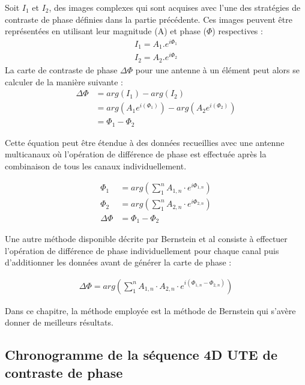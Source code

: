 Soit $I_1$ et $I_2$, des images complexes qui sont acquises avec l'une des stratégies de contraste de phase définies dans la partie précédente. Ces images peuvent être représentées en utilisant leur magnitude (A) et phase ($\Phi$) respectives :
\begin{equation}
\begin{split}
I_1= A_1 . e^{i \Phi_1} \\
I_2= A_2 . e^{i \Phi_2}
\end{split}
\end{equation}
La carte de contraste de phase $\Delta \Phi$ pour une antenne à un élément peut alors se calculer de la manière suivante :
\begin{equation}
\begin{split}
\Delta \Phi &= arg(I_1) - arg(I_2) \\
				  &= arg(A_1e^{i(\Phi_1)}) - arg(A_2e^{i(\Phi_2)}) \\
				  &= \Phi_1-\Phi_2
\end{split}
\end{equation}

Cette équation peut être étendue à des données recueillies avec une antenne multicanaux où l'opération de différence de phase est effectuée après la combinaison de tous les canaux individuellement.

\begin{equation}
\begin{split}
\Phi_1 &= arg( \sum_1^n  A_{1,n} \cdot e^{i \Phi_{1,n}}) \\
\Phi_2 &= arg( \sum_1^n  A_{2,n} \cdot e^{i \Phi_{2,n}}) \\
\Delta \Phi &= \Phi_1 - \Phi_2
\end{split}
\end{equation}

Une autre méthode disponible décrite par Bernstein et al \cite{bernstein1994reconstructions} consiste à effectuer l'opération de différence de phase individuellement pour chaque canal puis d'additionner les données avant de générer la carte de phase :

\begin{align}
\Delta \Phi = arg(\sum_1^n A_{1,n} \cdot A_{2,n} \cdot e^{i(\Phi_{1,n} - \Phi_{2,n})})
\end{align}

Dans ce chapitre, la méthode employée est la méthode de Bernstein qui s'avère donner de meilleurs résultats.

\subsection{Chronogramme de la séquence 4D UTE de contraste de phase}

